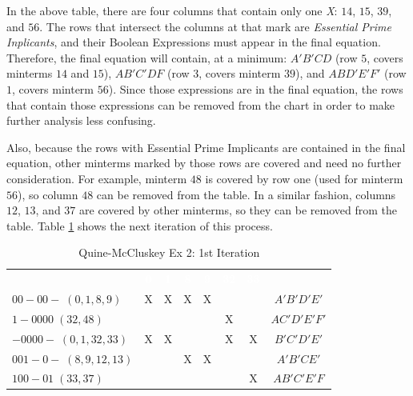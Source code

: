 In the above table, there are four columns that contain only one \emph{X}: $ 14 $, $ 15 $, $ 39 $, and $ 56 $. The rows that intersect the columns at that mark are \emph{Essential Prime Inplicants}, and their Boolean Expressions must appear in the final equation. Therefore, the final equation will contain, at a minimum: $ A'B'CD $ (row $ 5 $, covers minterms $ 14 $ and $ 15 $), $ AB'C'DF $ (row $ 3 $, covers minterm $ 39 $), and $ ABD'E'F' $ (row $ 1 $, covers minterm $ 56 $). Since those expressions are in the final equation, the rows that contain those expressions can be removed from the chart in order to make further analysis less confusing. 

Also, because the rows with Essential Prime Implicants are contained in the final equation, other minterms marked by those rows are covered and need no further consideration. For example, minterm $ 48 $ is covered by row one (used for minterm $ 56 $), so column $ 48 $ can be removed from the table. In a similar fashion, columns $ 12 $, $ 13 $, and $ 37 $ are covered by other minterms, so they can be removed from the table. Table \ref{ASM:tab:qm_ex_2_1st_iteration} shows the next iteration of this process.

\begin{table}[H]
	\sffamily
	\newcommand{\head}[1]{\textcolor{white}{\textbf{#1}}}		
	\begin{center}
		\begin{adjustbox}{max width=\textwidth}
			\begin{tabular}{lccccccc} 
				\rowcolor{black!75}
				& \head{0} & \head{1} & \head{8} & \head{9}
				& \head{32} & \head{33} & \\
				$ 00-00-\;(0,1,8,9) $     & X & X & X & X &   &   & $ A'B'D'E' $ \\
				$ 1-0000\;(32,48) $       &   &   &   &   & X &   & $ AC'D'E'F' $ \\
				$ -0000-\;(0,1,32,33) $   & X & X &   &   & X & X & $ B'C'D'E' $ \\
				$ 001-0-\;(8,9,12,13) $   &   &   & X & X &   &   & $ A'B'CE' $ \\
				$ 100-01\;(33,37) $       &   &   &   &   &   & X & $ AB'C'E'F $ \\
				\hline
			\end{tabular}
		\end{adjustbox}
	\end{center}
	\caption{Quine-McCluskey Ex 2: 1st Iteration}
  \label{ASM:tab:qm_ex_2_1st_iteration}
\end{table}

